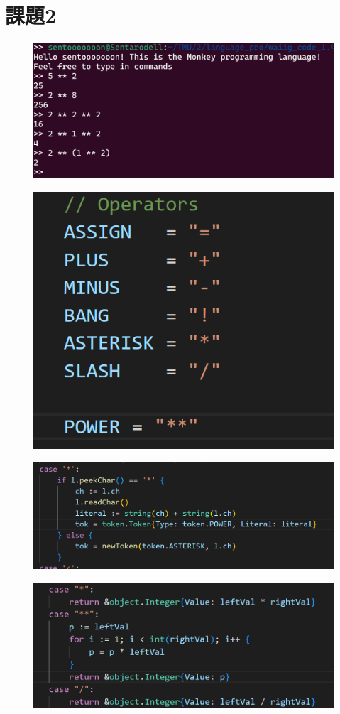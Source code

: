 \documentclass[fleqn, a4paper. 12pt]{ltjsarticle}
\begin{document}
\section{課題2}
\begin{figure}[h]
    \centering
    \includegraphics[width=0.5\linewidth]{images/2_result.png}
    \label{fig:example}
\end{figure}
\begin{figure}[h]
    \centering
    \includegraphics[width=0.5\linewidth]{images/2_token.png}
    \label{fig:example}
\end{figure}

\begin{figure}[h]
    \centering
    \includegraphics[width=0.5\linewidth]{images/2_lex.png}
    \label{fig:example}
\end{figure}
\begin{figure}[h]
    \centering
    \includegraphics[width=0.5\linewidth]{images/2_eval.png}
    \label{fig:example}
\end{figure}
\end{document}
